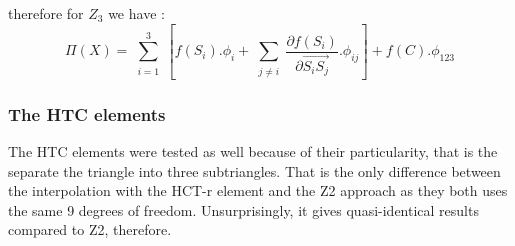 \documentclass[proc]{edpsmath}
\begin{document}
\noindent therefore for $Z_3$ we have :
\begin{equation*}
 \Pi (X) = \sum \limits_{\substack{i=1 }}^{3}{ [f(S_i).\phi_i + \sum \limits_{\substack{j\neq i }}^{}{ \frac{\partial f(S_i)}{\partial  \overrightarrow{ S_i S_j } }.\phi_{ij} } ] } + f(C).\phi_{123}
\end{equation*}

\subsubsection{The HTC elements}
The HTC elements were tested as well because of their particularity, that is the separate the triangle into three subtriangles. That is the only difference between the interpolation with the HCT-r element and the  Z2 approach as they both uses the same 9 degrees of freedom. Unsurprisingly, it gives quasi-identical results compared to Z2, therefore.
\end{document}
